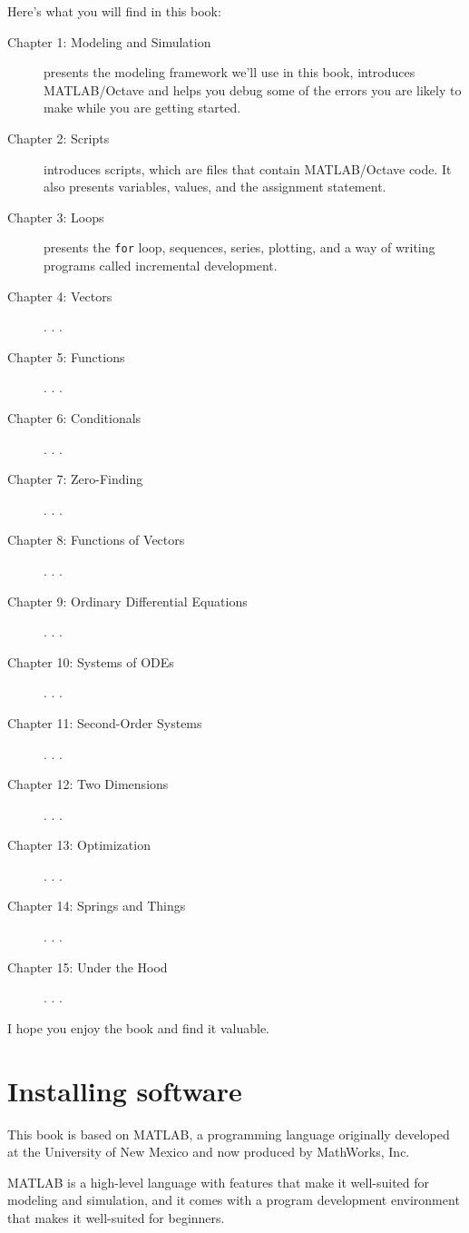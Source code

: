 Here's what you will find in this book:
\begin{description}
\item [Chapter 1: Modeling and Simulation] presents the modeling framework we'll use in this book, introduces MATLAB/Octave and helps you debug some of the errors you are likely to make while you are getting started.

\item [Chapter 2: Scripts] introduces scripts, which are files that contain MATLAB/Octave code.  It also presents variables, values, and the assignment statement.

\item [Chapter 3: Loops] presents the {\tt for} loop, sequences, series, plotting, and a way of writing programs called incremental development.

\item [Chapter 4: Vectors] . . .
\item [Chapter 5: Functions] . . .
\item [Chapter 6: Conditionals] . . .
\item [Chapter 7: Zero-Finding] . . .
\item [Chapter 8: Functions of Vectors] . . .
\item [Chapter 9: Ordinary Differential Equations] . . .
\item [Chapter 10: Systems of ODEs] . . .
\item [Chapter 11: Second-Order Systems] . . .
\item [Chapter 12: Two Dimensions] . . .
\item [Chapter 13: Optimization] . . .
\item [Chapter 14: Springs and Things] . . .
\item [Chapter 15: Under the Hood] . . .

\end{description}

I hope you enjoy the book and find it valuable.

\section*{Installing software}

This book is based on MATLAB, a programming language originally developed at the University of New Mexico and now produced by MathWorks, Inc.  

MATLAB is a high-level language with features that make it well-suited for modeling and simulation, and it comes with a program development environment that makes it well-suited for beginners.

